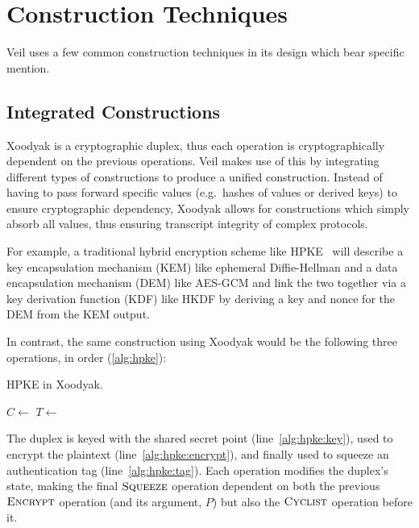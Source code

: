 \section{Construction Techniques}\label{sec:construction-techniques}

Veil uses a few common construction techniques in its design which bear specific mention.

\subsection{Integrated Constructions}\label{subsec:cons-integrated-constructions}

Xoodyak is a cryptographic duplex, thus each operation is cryptographically dependent on the previous operations.
Veil makes use of this by integrating different types of constructions to produce a unified construction.
Instead of having to pass forward specific values (e.g.\ hashes of values or derived keys) to ensure cryptographic
dependency, Xoodyak allows for constructions which simply absorb all values, thus ensuring transcript integrity of
complex protocols.

For example, a traditional hybrid encryption scheme like HPKE~\cite{rfc9180} will describe a key encapsulation mechanism
(KEM) like ephemeral Diffie-Hellman and a data encapsulation mechanism (DEM) like AES-GCM and link the two together via
a key derivation function (KDF) like HKDF by deriving a key and nonce for the DEM from the KEM output.

In contrast, the same construction using Xoodyak would be the following three operations, in order (\ref{alg:hpke}):

\begin{algorithm}[ht]
    \caption{HPKE in Xoodyak.}
    \begin{algorithmic}[1]
        \State {} \label{alg:hpke:key}
        \State $C \gets $  \label{alg:hpke:encrypt}
        \State $T \gets $  \label{alg:hpke:tag}
    \end{algorithmic}
    \label{alg:hpke}
\end{algorithm}

The duplex is keyed with the shared secret point (line~\ref{alg:hpke:key}), used to encrypt the plaintext
(line~\ref{alg:hpke:encrypt}), and finally used to squeeze an authentication tag (line~\ref{alg:hpke:tag}).
Each operation modifies the duplex's state, making the final $\textsc{Squeeze}$ operation dependent on both the
previous $\textsc{Encrypt}$ operation (and its argument, $P$) but also the $\textsc{Cyclist}$ operation before it.

